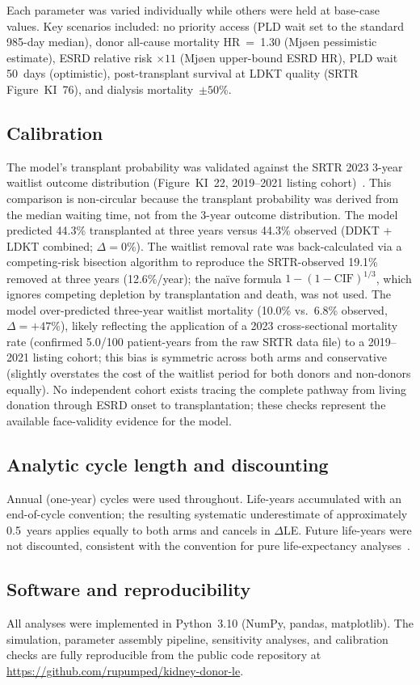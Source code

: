 Each parameter was varied individually while others were held at base-case values. Key scenarios included: no priority access (PLD wait set to the standard 985-day median), donor all-cause mortality HR~=~1.30 (Mjøen pessimistic estimate), ESRD relative risk $\times 11$ (Mjøen upper-bound ESRD HR), PLD wait 50~days (optimistic), post-transplant survival at LDKT quality (SRTR Figure~KI~76), and dialysis mortality~$\pm 50\%$.

\subsection{Calibration}
The model's transplant probability was validated against the SRTR 2023 3-year waitlist outcome distribution (Figure~KI~22, 2019--2021 listing cohort)~\cite{srtr_2023}. This comparison is non-circular because the transplant probability was derived from the median waiting time, not from the 3-year outcome distribution. The model predicted 44.3\% transplanted at three years versus 44.3\% observed (DDKT + LDKT combined; $\Delta = 0\%$). The waitlist removal rate was back-calculated via a competing-risk bisection algorithm to reproduce the SRTR-observed 19.1\% removed at three years (12.6\%/year); the na\"{i}ve formula $1-(1-\mathrm{CIF})^{1/3}$, which ignores competing depletion by transplantation and death, was not used. The model over-predicted three-year waitlist mortality (10.0\% vs.\ 6.8\% observed, $\Delta = +47\%$), likely reflecting the application of a 2023 cross-sectional mortality rate (confirmed 5.0/100 patient-years from the raw SRTR data file) to a 2019--2021 listing cohort; this bias is symmetric across both arms and conservative (slightly overstates the cost of the waitlist period for both donors and non-donors equally). No independent cohort exists tracing the complete pathway from living donation through ESRD onset to transplantation; these checks represent the available face-validity evidence for the model.

\subsection{Analytic cycle length and discounting}
Annual (one-year) cycles were used throughout. Life-years accumulated with an end-of-cycle convention; the resulting systematic underestimate of approximately 0.5~years applies equally to both arms and cancels in $\Delta$LE. Future life-years were not discounted, consistent with the convention for pure life-expectancy analyses~\cite{gold_cost_1996}.

\subsection{Software and reproducibility}
All analyses were implemented in Python~3.10 (NumPy, pandas, matplotlib). The simulation, parameter assembly pipeline, sensitivity analyses, and calibration checks are fully reproducible from the public code repository at \url{https://github.com/rupumped/kidney-donor-le}.